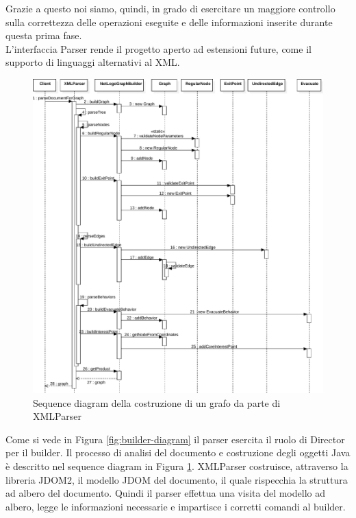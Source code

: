 Grazie a questo noi siamo, quindi, in grado di esercitare un maggiore controllo sulla correttezza delle operazioni eseguite e delle informazioni inserite durante questa prima fase.\\
L'interfaccia Parser rende il progetto aperto ad estensioni future, come il supporto di linguaggi alternativi al XML.\\
\begin{figure}[htbp]
\centering
\includegraphics[width=\textwidth,height=\textheight,keepaspectratio]{images/builder-sequence.pdf}
\caption{Sequence diagram della costruzione di un grafo da parte di XMLParser}
\label{fig:builder-sequence}
\end{figure}
Come si vede in Figura \ref{fig:builder-diagram} il parser esercita il ruolo di Director per il builder. Il processo di analisi del documento e costruzione degli oggetti Java è descritto nel sequence diagram in Figura \ref{fig:builder-sequence}.
XMLParser costruisce, attraverso la libreria JDOM2, il modello JDOM del documento, il quale rispecchia la struttura ad albero del documento. Quindi il parser effettua una visita del modello ad albero, legge le informazioni necessarie e impartisce i corretti comandi al builder.\\

